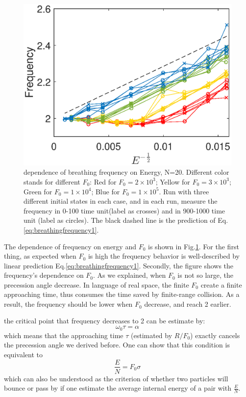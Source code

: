 \documentclass[aps,preprintnumbers,onecolumn,amsmath,amssymb,floatfix,pra]{revtex4-1}
\begin{document}
\begin{figure}[h]
\centering
\includegraphics[scale=0.6]{ZhiyuPictures/freq_scanF_scanE_pre_Font18.eps}
\caption{dependence of breathing frequency on Energy, N=20. Different color stands for different $F_0$: Red for $F_0=2\times10^3$; Yellow for $F_0=3\times10^3$; Green for $F_0=1\times10^4$;  Blue for $F_0=1\times10^5$. Run with three different initial states in each case, and in each run, measure the frequency in 0-100 time unit(label as crosses) and in 900-1000 time unit (label as circles). The black dashed line is the prediction of Eq.\ref{eq:breathingfrequency1}.}
\label{fig:Breathingfrequency4}
\end{figure}

The dependence of frequency on energy and $F_0$ is shown in Fig.\ref{fig:Breathingfrequency4}. For the first thing, as expected when $F_0$ is high the frequency behavior is well-described by linear prediction Eq.\ref{eq:breathingfrequency1}. Secondly, the figure shows the frequency's dependence on $F_0$. As we explained, when $F_0$ is not so large, the precession angle decrease. In language of real space, the finite $F_0$ create a finite approaching time, thus consumes the time saved by finite-range collision. As a result, the frequency should be lower when $F_0$ decrease, and reach 2 earlier.

the critical point that frequency decreases to 2 can be estimate by:
\begin{equation}
\omega_0 \tau=\alpha
\end{equation}
which means that the approaching time $\tau$ (estimated by $R/F_0$) exactly cancels the precession angle we derived before. One can show that this condition is equivalent to
\begin{equation}
\frac{E}{N}=F_0\sigma
\end{equation}
which can also be understood as the criterion of whether two particles will bounce or pass by if one estimate the average internal energy of a pair with $\frac{E}{N}$. 
\end{document}
